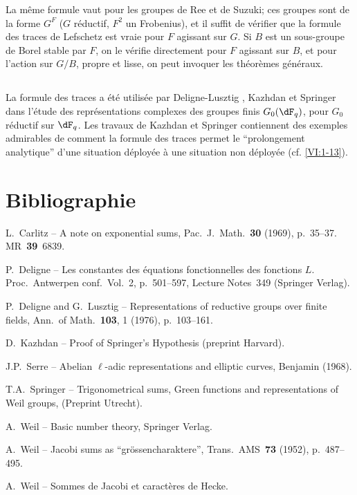\documentclass[oneside]{book}
\newcounter{char}
\theoremstyle{sga-source}
\theoremstyle{sga-source-dash}
\theoremstyle{sga-source-dotdash}
\theoremstyle{sga-source-number-note-dash}
\theoremstyle{sga-source-note-number-dotdash}
\theoremstyle{sga-source-example-dotdash}
\theoremstyle{sga-source-inline-number}
\theoremstyle{sga-source-bare-number}
\theoremstyle{sga-source}
\newcommand{\PrintPage}[1]{}\newcommand{\MathPage}[1]{}\newcommand{\PrintCite}[2]{#1}\newcommand{\var}[3]{#1}
\begin{document}
\PrintPage{231}
La même formule vaut pour les groupes de Ree et de Suzuki; ces groupes sont 
de la forme $G^F$ ($G$ réductif, $F^2$ un Frobenius), et il suffit de 
vérifier que la formule des traces de Lefschetz est vraie pour $F$ agissant 
sur $G$. Si $B$ est un sous-groupe de Borel stable par $F$, on le vérifie 
directement pour $F$ agissant sur $B$, et pour l'action sur $G/B$, propre et 
lisse, on peut invoquer les théorèmes généraux. 





\subsection{}\label{VI:8-3}

La formule des traces a été utilisée par Deligne-Lusztig \cite{dl76}, 
Kazhdan \cite{ka77} et Springer \cite{sp76} dans l'étude des 
représentations complexes des groupes finis $G_0(\dF_q)$, pour $G_0$ 
réductif sur $\dF_q$. Les travaux de Kazhdan et Springer contiennent des 
exemples admirables de comment la formule des traces permet le ``prolongement 
analytique'' d'une situation déployée à une situation non déployée 
(cf. \ref{VI:1-13}). 







\PrintPage{232}
\section*{Bibliographie}
\begin{enumerate}[{[}1{]}]
\item L.~Carlitz -- A note on exponential sums, Pac.~J.~Math.~\textbf{30} (1969), p.~35--37. MR~\textbf{39}~6839.
\item P.~Deligne -- Les constantes des équations fonctionnelles des fonctions $L$.
Proc.~Antwerpen conf.~Vol.~2, p.~501--597, Lecture Notes~349 (Springer Verlag).
\item P.~Deligne and G.~Lusztig -- Representations of reductive groups over finite fields,
Ann.~of Math.~\textbf{103}, 1 (1976), p.~103--161.
\item D.~Kazhdan -- Proof of Springer's Hypothesis (preprint Harvard).
\item J.P.~Serre -- Abelian $\ell$-adic representations and elliptic curves, Benjamin (1968).
\item T.A.~Springer -- Trigonometrical sums, Green functions and representations of
\var{Weil}{Weyl}{S45-ASTRA-S-0049} groups, (Preprint Utrecht).
\item A.~Weil -- Basic number theory, Springer Verlag.
\item A.~Weil -- Jacobi sums as ``gr\"ossencharaktere'', Trans.~AMS~\textbf{73} (1952), p.~487--495.
\item A.~Weil -- Sommes de Jacobi et caractères de Hecke.
\end{enumerate}
\end{document}
